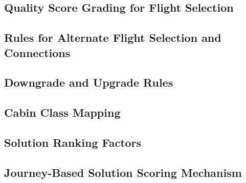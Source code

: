 \documentclass{article}
\begin{document}
\begin{flushleft}
\begin{enumerate}
\end{enumerate}

\subsection{Quality Score Grading for Flight Selection}

\subsection{Rules for Alternate Flight Selection and Connections}

\subsection{Downgrade and Upgrade Rules}

\subsection{Cabin Class Mapping}

\subsection{Solution Ranking Factors}

\subsection{Journey-Based Solution Scoring Mechanism}



\end{flushleft}
\end{document}
